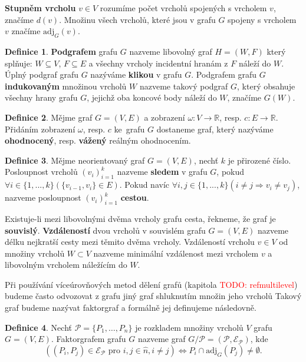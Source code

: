 \documentclass[11pt,american,czech,oneside]{book}
\theoremstyle{plain}
\theoremstyle{definition}
\newtheorem{definition}{Definice}
\newcommand{\TODO}[1]{\textcolor{red}{TODO: #1}}
\begin{document}
\textbf{Stupněm vrcholu} $v \in V$ rozumíme počet vrcholů spojených s vrcholem $v$, značíme $d(v)$. Množinu všech vrcholů, které jsou v grafu $G$ spojeny s vrcholem $v$ značíme $\mathrm{adj}_G(v)$.

\begin{definition}
  \textbf{Podgrafem} grafu $G$ nazveme libovolný graf $H=(W,F)$ který splňuje: $W\subseteq V$, $F\subseteq E$ a všechny vrcholy incidentní hranám z $F$ náleží do $W$. Úplný podgraf grafu $G$ nazýváme \textbf{klikou} v grafu $G$. Podgrafem grafu $G$ \textbf{indukovaným} množinou vrcholů $W$ nazveme takový podgraf $G$, který obsahuje všechny hrany grafu $G$, jejichž oba koncové body náleží do $W$, značíme $G(W)$.
\end{definition}

\begin{definition}
  Mějme graf $G=(V,E)$ a zobrazení $\omega:V \rightarrow \mathbb{R}$, resp. $c: E \rightarrow \mathbb{R}$. Přidáním zobrazení $\omega$, resp. $c$ ke~grafu $G$ dostaneme graf, který nazýváme \textbf{ohodnocený}, resp. \textbf{vážený} reálným ohodnocením.
\end{definition}

\begin{definition}
  Mějme neorientovaný graf $G=(V,E)$, nechť $k$ je přirozené číslo. Posloupnost vrcholů $(v_i)_{i=1}^{k}$ nazveme \textbf{sledem} v grafu $G$, pokud $\forall i \in \{1,...,k\} (\{v_{i-1},v_i\} \in E)$. Pokud navíc  $\forall i,j \in \{1,...,k\} (i \neq j \Rightarrow v_i \neq v_j)$, nazveme posloupnost $(v_i)_{i=1}^{k}$ \textbf{cestou}.
\end{definition}

Existuje-li mezi libovolnými dvěma vrcholy grafu cesta, řekneme, že graf je \textbf{souvislý}.
\textbf{Vzdáleností} dvou vrcholů v souvislém grafu $G=(V,E)$ nazveme délku nejkratší cesty mezi těmito dvěma vrcholy. Vzdáleností vrcholu $v \in V$ od množiny vrcholů $W \subset V$ nazveme minimální vzdálenost mezi vrcholem $v$ a libovolným vrcholem náležícím do $W$. 

\medskip

Při používání víceúrovňových metod dělení grafů (kapitola \TODO{ref{multilevel}}) budeme často odvozovat z grafu jiný graf shluknutím množin jeho vrcholů Takový graf budeme nazývat faktorgraf a formálně jej definujeme následovně.
\begin{definition}
  Nechť $\mathcal{P} = \{P_1,\ldots,P_n\}$ je rozkladem množiny vrcholů $V$ grafu $G = (V, E)$. Faktorgrafem grafu $G$ nazveme graf $G / \mathcal{P} = (\mathcal{P}, \mathcal{E_P})$, kde 
  \[
    \left(
      (P_i, P_j)\in \mathcal{E_P} \mbox{ pro } i,j \in \widehat{n}, i \neq j 
    \right)
    \Leftrightarrow {P_i \cap \mathrm{adj}_G(P_j) \neq \emptyset}
    .
  \]
\end{definition}
\end{document}
